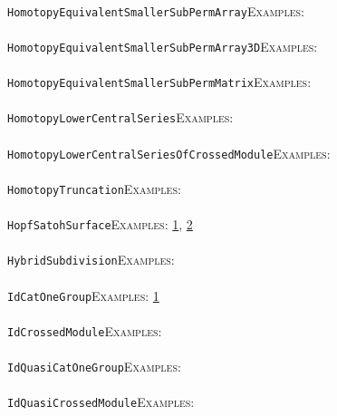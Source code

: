 \documentclass[a4paper,11pt]{report}
\begin{document}
{{ \\
 \texttt{HomotopyEquivalentSmallerSubPermArray}{\nobreakspace}{\nobreakspace}{\nobreakspace}{\nobreakspace}\textsc{Examples:} \\
 \\
 \texttt{HomotopyEquivalentSmallerSubPermArray3D}{\nobreakspace}{\nobreakspace}{\nobreakspace}{\nobreakspace}\textsc{Examples:} \\
 \\
 \texttt{HomotopyEquivalentSmallerSubPermMatrix}{\nobreakspace}{\nobreakspace}{\nobreakspace}{\nobreakspace}\textsc{Examples:} \\
 \\
 \texttt{HomotopyLowerCentralSeries}{\nobreakspace}{\nobreakspace}{\nobreakspace}{\nobreakspace}\textsc{Examples:} \\
 \\
 \texttt{HomotopyLowerCentralSeriesOfCrossedModule}{\nobreakspace}{\nobreakspace}{\nobreakspace}{\nobreakspace}\textsc{Examples:} \\
 \\
 \texttt{HomotopyTruncation}{\nobreakspace}{\nobreakspace}{\nobreakspace}{\nobreakspace}\textsc{Examples:} \\
 \\
 \texttt{HopfSatohSurface}{\nobreakspace}{\nobreakspace}{\nobreakspace}{\nobreakspace}\textsc{Examples:} \href{tutorial/chap3.html} {1}{\nobreakspace}, \href{../www/SideLinks/About/aboutCoverinSpaces.html} {2}{\nobreakspace} \\
 \\
 \texttt{HybridSubdivision}{\nobreakspace}{\nobreakspace}{\nobreakspace}{\nobreakspace}\textsc{Examples:} \\
 \\
 \texttt{IdCatOneGroup}{\nobreakspace}{\nobreakspace}{\nobreakspace}{\nobreakspace}\textsc{Examples:} \href{../www/SideLinks/About/aboutquasi.html} {1}{\nobreakspace} \\
 \\
 \texttt{IdCrossedModule}{\nobreakspace}{\nobreakspace}{\nobreakspace}{\nobreakspace}\textsc{Examples:} \\
 \\
 \texttt{IdQuasiCatOneGroup}{\nobreakspace}{\nobreakspace}{\nobreakspace}{\nobreakspace}\textsc{Examples:} \\
 \\
 \texttt{IdQuasiCrossedModule}{\nobreakspace}{\nobreakspace}{\nobreakspace}{\nobreakspace}\textsc{Examples:} \\
 \\
}}
\end{document}
